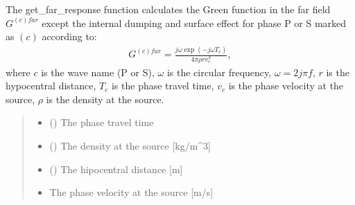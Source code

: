 \documentclass[letterpaper,10pt,english]{sphinxmanual}
\begin{document}

\begin{fulllineitems}
\label{\detokenize{api_support:amw.mw.parameters.get_far_response}}
\pysigstartsignatures
{}
\pysigstopsignatures
\sphinxAtStartPar
The get\_far\_response function calculates the Green function in the far field \(G^{\left(c\right)far}\)
except the internal dumping and surface effect for phase P or S marked as \(\left(c\right)\) according to:
\begin{equation*}
\begin{split}G^{\left(c\right)far}=\frac{j\omega \exp\left(-j\omega T_c\right)}{4\pi\rho rv_c^3},\end{split}
\end{equation*}
\sphinxAtStartPar
where
\(c\) is the wave name (P or S),
\(\omega\) is the circular frequency, \(\omega = 2j\pi f\),
\(r\) is the hypocentral distance,
\(T_c\) is the phase travel time,
\(v_c\) is the phase velocity at the source,
\(\rho\) is the density at the source.
\begin{quote}\begin{description}
\begin{itemize}
\item {} 
\sphinxAtStartPar
{} () \textendash{} The phase travel time

\item {} 
\sphinxAtStartPar
{} () \textendash{} The density at the source {[}kg/m\textasciicircum{}3{]}

\item {} 
\sphinxAtStartPar
{} () \textendash{} The hipocentral distance {[}m{]}

\item {} 
\sphinxAtStartPar
{} \textendash{} The phase velocity at the source {[}m/s{]}


\end{itemize}
\end{description}
\end{quote}
\end{fulllineitems}
\end{document}
